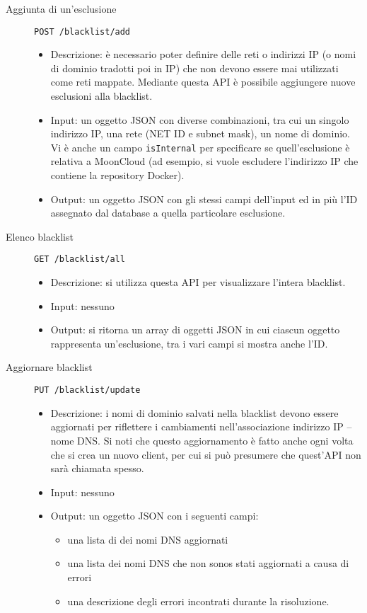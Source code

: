 \begin{description}
    \item[Aggiunta di un'esclusione]\texttt{POST /blacklist/add}
    \begin{itemize}
        \item Descrizione: è necessario poter definire delle reti o
        indirizzi IP (o nomi di dominio tradotti poi in IP) che non
        devono essere mai utilizzati come reti mappate. Mediante questa
        API è possibile aggiungere nuove esclusioni alla blacklist.
        \item Input: un oggetto JSON con diverse combinazioni,
        tra cui un singolo indirizzo IP, una rete (NET ID e subnet mask),
        un nome di dominio. Vi è anche un campo \texttt{isInternal} per specificare
        se quell'esclusione è relativa a MoonCloud (ad esempio, si vuole escludere
        l'indirizzo IP che contiene la repository Docker).
        \item Output: un oggetto JSON con gli stessi campi dell'input ed in
        più l'ID assegnato dal database a quella particolare esclusione.
    \end{itemize}

    \item[Elenco blacklist]\texttt{GET /blacklist/all}
    \begin{itemize}
        \item Descrizione: si utilizza questa API per visualizzare l'intera
        blacklist.
        \item Input: nessuno
        \item Output: si ritorna un array di oggetti JSON in cui ciascun oggetto
        rappresenta un'esclusione, tra i vari campi si mostra anche l'ID.
    \end{itemize}

    \item[Aggiornare blacklist]\texttt{PUT /blacklist/update}
    \begin{itemize}
        \item Descrizione: i nomi di dominio salvati nella blacklist devono
        essere aggiornati per riflettere i cambiamenti nell'associazione
        indirizzo IP -- nome DNS. Si noti che questo aggiornamento è fatto
        anche ogni volta che si crea un nuovo client, per cui si può presumere
        che quest'API non sarà chiamata spesso.
        \item Input: nessuno
        \item Output: un oggetto JSON con i seguenti campi:
        \begin{itemize}
            \item una lista di dei nomi DNS aggiornati
            \item una lista dei nomi DNS che non sonos stati aggiornati a causa
            di errori
            \item una descrizione degli errori incontrati durante la risoluzione.
        \end{itemize}
    \end{itemize}


\end{description}
